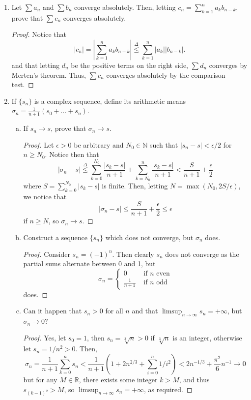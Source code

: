 \documentclass{scrbook}
\newcommand{\N}{\mathbb{N}}
\newcommand{\R}{\mathbb{R}}
\renewcommand{\to}{\rightarrow}
\begin{document}
\begin{enumerate}
\item %
Let $\sum a_n$ and $\sum b_n$ converge absolutely. Then, letting $c_n = \sum_{k=1}^{n} a_k b_{n-k}$, prove that $\sum c_n$ converges absolutely.

\begin{proof}
Notice that
\[
    |c_n| = \left| \sum_{k=1}^{n} a_k b_{n-k} \right| \overset{\Delta}{\le} \sum_{k=1}^{n} |a_k| |b_{n-k}|.    
\]
and that letting $d_n$ be the positive terms on the right side, $\sum d_n$ converges by Merten's theorem. Thus, $\sum c_n$ converges absolutely by the comparison test.
\end{proof}

\item %
If $\{s_n\}$ is a complex sequence, define its arithmetic means $\sigma_n = \frac{1}{n + 1} (s_0 + \dotsc + s_n)$. 
\begin{enumerate}[(a)]
\item If $s_n \to s$, prove that $\sigma_n \to s$.

\begin{proof}
    Let $\epsilon > 0$ be arbitrary and $N_0 \in \N$ such that $|s_n - s| < \epsilon/2$ for $n \ge N_0$. Notice then that 
    \[
        |\sigma_n - s| \overset{\Delta}{\le} \sum_{k=0}^{N_0} \frac{|s_k - s|}{n + 1} + \sum_{k=N_0}^{n} \frac{|s_k - s|}{n + 1} < \frac{S}{n + 1} + \frac{\epsilon}{2}
    \]
    where $S = \sum_{k=0}^{N_0} |s_k - s|$ is finite. Then, letting $N = \max(N_0, 2S/\epsilon)$, we notice that
    \[
        |\sigma_n - s| \le \frac{S}{n + 1} + \frac{\epsilon}{2} \le \epsilon
    \]
    if $n \ge N$, so $\sigma_n \to s$.
\end{proof}

\item Construct a sequence $\{s_n\}$ which does not converge, but $\sigma_n$ does. 

\begin{proof}
Consider $s_n = (-1)^{n}$. Then clearly $s_n$ does not converge as the partial sums alternate between 0 and 1, but
\[
    \sigma_n = \begin{cases}
        0 & \text{ if $n$ even} \\
        \frac{1}{n + 1} & \text{ if $n$ odd}
    \end{cases}
\]
does.
\end{proof}
\item Can it happen that $s_n > 0$ for all $n$ and that $\limsup_{n \to \infty} s_n = +\infty$, but $\sigma_n \to 0$?

\begin{proof}
    Yes, let $s_0 = 1$, then $s_n = \sqrt[3]{n} > 0$ if $\sqrt[3]{n}$ is an integer, otherwise let $s_n = 1/n^2 > 0$. Then,
    \[
        \sigma_n = \frac{1}{n + 1} \sum_{k=0}^{n} s_n < \frac{1}{n + 1} \left(1 + 2n^{2/3} + \sum_{i=0}^{n} 1/i^2 \right) < 2n^{-1/3} + \frac{\pi^2}{6}n^{-1} \to 0
    \]
    but for any $M \in \R$, there exists some integer $k > M$, and thus $s_{(k-1)^2} > M$, so $\limsup_{n \to \infty} s_n = +\infty$, as required.
\end{proof}


\end{enumerate}
\end{enumerate}
\end{document}
